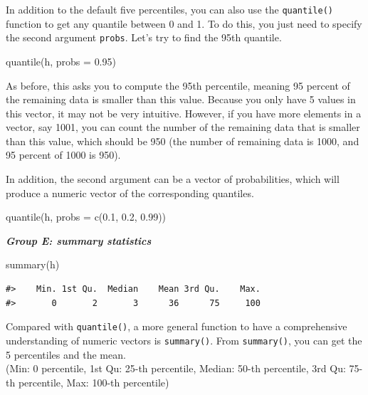 \documentclass[
]{book}
\newenvironment{Shaded}{\begin{snugshade}}{\end{snugshade}}
\newcommand{\AttributeTok}[1]{\textcolor[rgb]{0.77,0.63,0.00}{#1}}
\newcommand{\FloatTok}[1]{\textcolor[rgb]{0.00,0.00,0.81}{#1}}
\newcommand{\FunctionTok}[1]{\textcolor[rgb]{0.00,0.00,0.00}{#1}}
\newcommand{\NormalTok}[1]{#1}
\begin{document}
In addition to the default five percentiles, you can also use the \texttt{quantile()} function to get any quantile between 0 and 1. To do this, you just need to specify the second argument \texttt{probs}. Let's try to find the 95th quantile.

\begin{Shaded}
\begin{Highlighting}[]
\FunctionTok{quantile}\NormalTok{(h, }\AttributeTok{probs =} \FloatTok{0.95}\NormalTok{)}
\end{Highlighting}
\end{Shaded}

As before, this asks you to compute the 95th percentile, meaning 95 percent of the remaining data is smaller than this value. Because you only have 5 values in this vector, it may not be very intuitive. However, if you have more elements in a vector, say 1001, you can count the number of the remaining data that is smaller than this value, which should be 950 (the number of remaining data is 1000, and 95 percent of 1000 is 950).

In addition, the second argument can be a vector of probabilities, which will produce a numeric vector of the corresponding quantiles.

\begin{Shaded}
\begin{Highlighting}[]
\FunctionTok{quantile}\NormalTok{(h, }\AttributeTok{probs =} \FunctionTok{c}\NormalTok{(}\FloatTok{0.1}\NormalTok{, }\FloatTok{0.2}\NormalTok{, }\FloatTok{0.99}\NormalTok{))}
\end{Highlighting}
\end{Shaded}

\textbf{\emph{Group E: summary statistics}}

\begin{Shaded}
\begin{Highlighting}[]
\FunctionTok{summary}\NormalTok{(h)}
\end{Highlighting}
\end{Shaded}

\begin{verbatim}
#>    Min. 1st Qu.  Median    Mean 3rd Qu.    Max. 
#>       0       2       3      36      75     100
\end{verbatim}

Compared with \texttt{quantile()}, a more general function to have a comprehensive understanding of numeric vectors is \texttt{summary()}. From \texttt{summary()}, you can get the 5 percentiles and the mean.\\
(Min: 0 percentile, 1st Qu: 25-th percentile, Median: 50-th percentile, 3rd Qu: 75-th percentile, Max: 100-th percentile)
\end{document}
